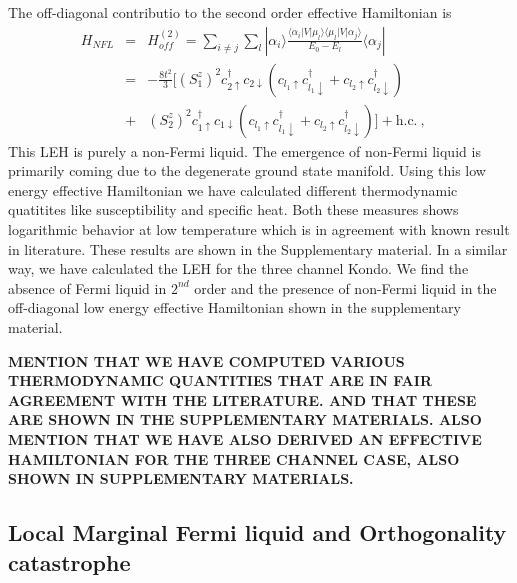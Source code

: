 \documentclass[reprint,prb,superscriptaddress]{revtex4-2}
\begin{document}
The off-diagonal contributio to the second order effective Hamiltonian is 
\begin{eqnarray}
H_{NFL}&=&H^{(2)}_{off} = \sum_{i\neq j} \sum_l |\alpha_i\rangle \frac{\langle \alpha_i  | V| \mu_l \rangle \langle \mu_l  | V| \alpha_j \rangle}{E_0-E_{l}}\langle \alpha_j | \nonumber\\
&=& -\frac{8t^2}{3} [ (S_1^z)^2 c_{2\uparrow}^{\dagger}c_{2\downarrow}  (  c_{l_1\uparrow}c_{l_1\downarrow}^{\dagger} +  c_{l_2\uparrow}c_{l_2\downarrow}^{\dagger}  ) \nonumber\\
&+& (S_2^z)^2 c_{1\uparrow}^{\dagger}c_{1\downarrow}  (  c_{l_1\uparrow}c_{l_1\downarrow}^{\dagger} +  c_{l_2\uparrow}c_{l_2\downarrow}^{\dagger}  ) ] + \textrm{h.c.} ~,~~~~
\label{eq:hamiltonian_NFL}
\end{eqnarray}
This LEH is purely a non-Fermi liquid. The emergence of non-Fermi liquid is primarily coming due to the degenerate ground state manifold. Using this low energy effective Hamiltonian we have calculated different thermodynamic quatitites like susceptibility and specific heat. Both these measures shows logarithmic behavior at low temperature which is in agreement with known result in literature. These results are shown in the Supplementary material. In a similar way, we have calculated the LEH for the three channel Kondo. We find the absence of Fermi liquid in $2^{nd}$ order and the presence of non-Fermi liquid in the off-diagonal low energy effective Hamiltonian shown in the supplementary material.

\textbf{MENTION THAT WE HAVE COMPUTED VARIOUS THERMODYNAMIC QUANTITIES THAT ARE IN FAIR AGREEMENT WITH THE LITERATURE. AND THAT THESE ARE SHOWN IN THE SUPPLEMENTARY MATERIALS. ALSO MENTION THAT WE HAVE ALSO DERIVED AN EFFECTIVE HAMILTONIAN FOR THE THREE CHANNEL CASE, ALSO SHOWN IN SUPPLEMENTARY MATERIALS.}

\subsection{Local Marginal Fermi liquid and Orthogonality catastrophe}
\label{sec:MFL}
\end{document}
